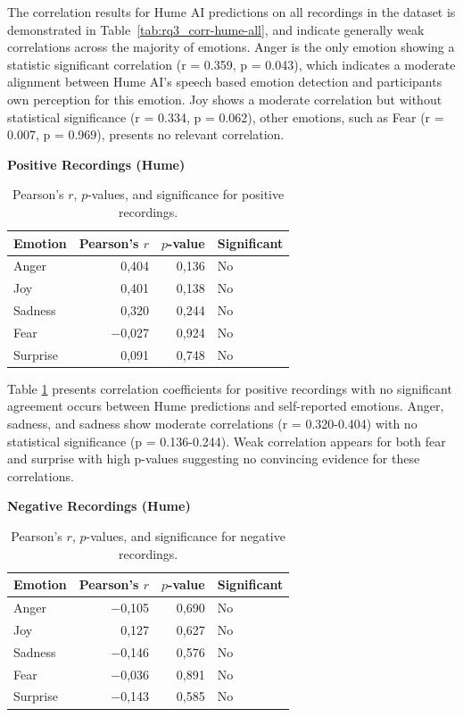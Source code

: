 The correlation results for Hume AI predictions on all recordings in the dataset is demonstrated in Table~\ref{tab:rq3_corr-hume-all}, and indicate generally weak correlations across the majority of emotions. 
Anger is the only emotion showing a statistic significant correlation (r = 0.359, p = 0.043), which indicates a moderate alignment between Hume AI's speech based emotion 
detection and participants own perception for this emotion. Joy shows a moderate correlation but without statistical significance (r = 0.334, p = 0.062), other emotions, such as Fear (r = 0.007, p = 0.969), presents no relevant correlation. 

  \begin{table}[H]
    \centering
    \caption*{\textbf{Positive Recordings (Hume)}}
    \begin{tabular}{lrrl}
      \toprule
      \textbf{Emotion} & \textbf{Pearson’s \(r\)} & \textbf{\(p\)-value} & \textbf{Significant} \\
      \midrule
      Anger    & 0,404 & 0,136 & No  \\
      Joy      & 0,401 & 0,138 & No  \\
      Sadness  & 0,320 & 0,244 & No  \\
      Fear     & \(-\)0,027 & 0,924 & No  \\
      Surprise & 0,091 & 0,748 & No  \\
      \bottomrule
    \end{tabular}
    \caption{Pearson’s \(r\), \(p\)-values, and significance for positive recordings.}
    \label{tab:rq3_corr-hume-pos}
  \end{table}

  Table \ref{tab:rq3_corr-hume-pos} presents correlation coefficients for positive recordings with no significant agreement occurs between Hume predictions and self-reported emotions. Anger, sadness, and sadness show moderate correlations (r = 0.320-0.404) with no statistical significance (p = 0.136-0.244). Weak correlation appears for both fear and surprise with high p-values suggesting no convincing evidence for these correlations. 

  \begin{table}[H]
    \centering
    \caption*{\textbf{Negative Recordings (Hume)}}
    \begin{tabular}{lrrl}
      \toprule
      \textbf{Emotion} & \textbf{Pearson’s \(r\)} & \textbf{\(p\)-value} & \textbf{Significant} \\
      \midrule
      Anger    & \(-\)0,105 & 0,690 & No  \\
      Joy      & 0,127     & 0,627 & No  \\
      Sadness  & \(-\)0,146 & 0,576 & No  \\
      Fear     & \(-\)0,036 & 0,891 & No  \\
      Surprise & \(-\)0,143 & 0,585 & No  \\
      \bottomrule
    \end{tabular}
    \caption{Pearson’s \(r\), \(p\)-values, and significance for negative recordings.}
    \label{tab:rq3_corr-hume-neg}
  \end{table}


